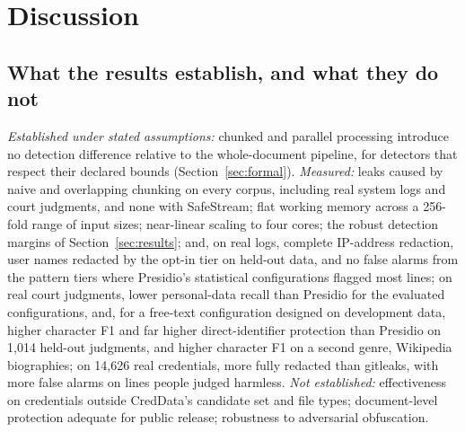 \section{Discussion}\label{sec:discussion}

\subsection{What the results establish, and what they do not}
\emph{Established under stated assumptions:} chunked and parallel processing introduce no detection difference relative to the whole-document pipeline, for detectors that respect their declared bounds (Section~\ref{sec:formal}). \emph{Measured:} leaks caused by naive and overlapping chunking on every corpus, including real system logs and court judgments, and none with SafeStream; flat working memory across a 256-fold range of input sizes; near-linear scaling to four cores; the robust detection margins of Section~\ref{sec:results}; and, on real logs, complete IP-address redaction, user names redacted by the opt-in tier on held-out data, and no false alarms from the pattern tiers where Presidio's statistical configurations flagged most lines; on real court judgments, lower personal-data recall than Presidio for the evaluated configurations, and, for a free-text configuration designed on development data, higher character F1 and far higher direct-identifier protection than Presidio on 1,014 held-out judgments, and higher character F1 on a second genre, Wikipedia biographies; on 14,626 real credentials, more fully redacted than gitleaks, with more false alarms on lines people judged harmless. \emph{Not established:} effectiveness on credentials outside CredData's candidate set and file types; document-level protection adequate for public release; robustness to adversarial obfuscation.

